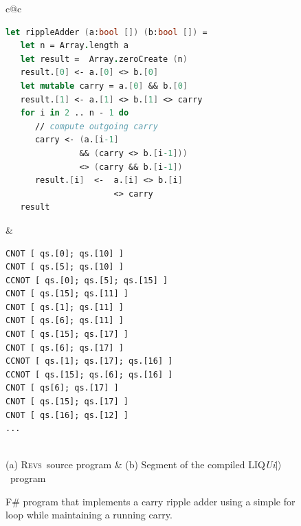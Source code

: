 \documentclass[conference]{IEEEtran}
\newcommand{\REVS}{{\textsc{Revs}}}
\newcommand{\LIQUID}{{LIQ{\em Ui}$|\rangle$}}
\begin{document}
\begin{figure}[hbt]
\small 
\begin{tabular}{c@{\qquad\;\;\qquad}c}
\begin{lstlisting}[language=FSharp]
let rippleAdder (a:bool []) (b:bool []) =
   let n = Array.length a
   let result =  Array.zeroCreate (n)
   result.[0] <- a.[0] <> b.[0]
   let mutable carry = a.[0] && b.[0]
   result.[1] <- a.[1] <> b.[1] <> carry
   for i in 2 .. n - 1 do
      // compute outgoing carry 
      carry <- (a.[i-1] 
               && (carry <> b.[i-1])) 
               <> (carry && b.[i-1])
      result.[i]  <-  a.[i] <> b.[i] 
                      <> carry
   result
\end{lstlisting}
& 
{\small
\begin{lstlisting}[language=qc]
CNOT [ qs.[0]; qs.[10] ]
CNOT [ qs.[5]; qs.[10] ]
CCNOT [ qs.[0]; qs.[5]; qs.[15] ]
CNOT [ qs.[15]; qs.[11] ]
CNOT [ qs.[1]; qs.[11] ]
CNOT [ qs.[6]; qs.[11] ]
CNOT [ qs.[15]; qs.[17] ]
CNOT [ qs.[6]; qs.[17] ]
CCNOT [ qs.[1]; qs.[17]; qs.[16] ]
CCNOT [ qs.[15]; qs.[6]; qs.[16] ]
CNOT [ qs[6]; qs.[17] ]
CNOT [ qs.[15]; qs.[17] ]
CNOT [ qs.[16]; qs.[12] ]
...
\end{lstlisting}}
\\
(a) \REVS~source program & (b) Segment of the compiled \LIQUID~program 
\end{tabular}
\medskip
\caption{\label{fig:rippleCode} F$\#$ program that implements a carry ripple adder using a simple for loop while maintaining a running carry.}
\end{figure}
\end{document}
